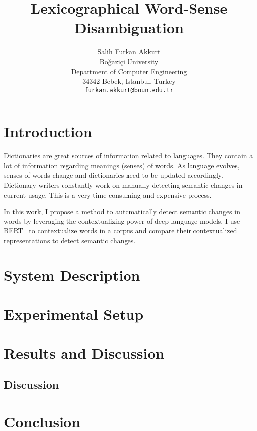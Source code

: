 \documentclass[11pt]{article}
\title{Lexicographical Word-Sense Disambiguation}
\author{Salih Furkan Akkurt \\
  Boğaziçi University \\
  Department of Computer Engineering \\
  34342 Bebek, Istanbul, Turkey \\
  {\tt furkan.akkurt@boun.edu.tr} \\}
\date{}
\begin{document}
\maketitle
\begin{abstract}

\end{abstract}

\section{Introduction}

Dictionaries are great sources of information related to languages.
They contain a lot of information regarding meanings (senses) of words.
As language evolves, senses of words change and dictionaries need to be updated accordingly.
Dictionary writers constantly work on manually detecting semantic changes in current usage.
This is a very time-consuming and expensive process.

In this work, I propose a method to automatically detect semantic changes in words by leveraging the contextualizing power of deep language models.
I use BERT~\cite{devlin-etal-2019-bert} to contextualize words in a corpus and compare their contextualized representations to detect semantic changes.


\section{System Description}

\section{Experimental Setup}

\section{Results and Discussion}

\subsection{Discussion}

\section{Conclusion}



\end{document}
